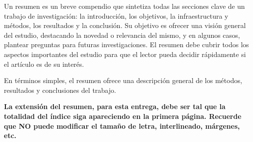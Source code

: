 Un resumen es un breve compendio que sintetiza todas las secciones clave de un trabajo de investigación: la introducción, los objetivos, la infraestructura y métodos, los resultados y la conclusión. Su objetivo es ofrecer una visión general del estudio, destacando la novedad o relevancia del mismo, y en algunos casos, plantear preguntas para futuras investigaciones. El resumen debe cubrir todos los aspectos importantes del estudio para que el lector pueda decidir rápidamente si el artículo es de su interés.

En términos simples, el resumen ofrece una descripción general de los métodos,
resultados y conclusiones del trabajo.

\textbf{La extensión del resumen, para esta entrega, debe ser tal que la totalidad del índice siga apareciendo en la primera página. Recuerde que NO puede modificar el tamaño de letra, interlineado, márgenes, etc.}
